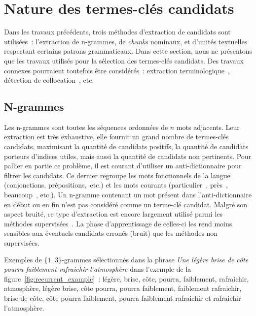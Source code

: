     \section{Nature des termes-clés candidats}
    \label{sec:main-state_of_the_art-keyphrase_candidate_selection-keyphrase_candidate_nature}
      Dans les travaux précédents, trois méthodes d'extraction de candidats sont
      utilisées~: l'extraction de n-grammes, de \textit{chunks} nominaux, et
      d'unités textuelles respectant certains patrons grammaticaux. Dans cette
      section, nous ne présentons que les travaux utilisés pour la sélection des
      termes-clés candidats. Des travaux connexes pourraient toutefois être
      considérés~: extraction
      terminologique~\cite{castellvi2001automatictermdetection}, détection de
      collocation~\cite{pearce2002collocationdetection}, etc.

      \subsection{N-grammes}
      \label{subsec:main-state_of_the_art-automatic_keyphrase_extraction-automatic_keyphrase_extraction-n_grams}
        Les n-grammes sont toutes les séquences ordonnées de $n$ mots adjacents.
        Leur extraction est très exhaustive, elle fournit un grand nombre de
        termes-clés candidats, maximisant la quantité de candidats positifs, la
        quantité de candidats porteurs d'indices utiles, mais aussi la quantité
        de candidats non pertinents. Pour pallier en partie ce problème, il est
        courant d'utiliser un anti-dictionnaire pour filtrer les candidats. Ce
        dernier regroupe les mots fonctionnels de la langue (conjonctions,
        prépositions,~etc.) et les mots courants (\og particulier~\fg, \og
        près~\fg, \og beaucoup~\fg, etc.). Un n-gramme contenant un mot présent
        dans l'anti-dictionnaire en début ou en fin n'est pas considéré comme un
        terme-clé candidat. Malgré son aspect bruité, ce type d'extraction est
        encore largement utilisé parmi les méthodes
        supervisées~\cite{witten1999kea,turney1999learningalgorithms,hulth2003keywordextraction}.
        La phase d'apprentissage de celles-ci les rend moins sensibles aux
        éventuels candidats erronés (bruit) que les méthodes non supervisées.

        Exemples de $\{1..3\}$-grammes sélectionnés dans la phrase
        \textit{\og{}Une légère brise de côte pourra faiblement rafraichir
        l'atmosphère\fg{}} dans l'exemple de la
        figure~\ref{fig:recurrent_example}~: \og{}légère\fg{}, \og{}brise\fg{},
        \og{}côte\fg{}, \og{}pourra\fg{}, \og{}faiblement\fg{},
        \og{}rafraichir\fg{}, \og{}atmosphère\fg{}, \og{}légère brise\fg{},
        \og{}côte pourra\fg{}, \og{}pourra faiblement\fg{}, \og{}faiblement
        rafraichir\fg{}, \og{}brise de côte\fg{}, \og{}côte pourra
        faiblement\fg{}, \og{}pourra faiblement rafraichir\fg{} et
        \og{}rafraichir l'atmosphère\fg{}.

